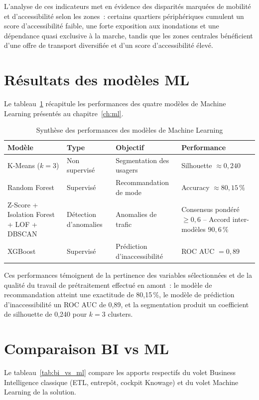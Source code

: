 L'analyse de ces indicateurs met en évidence des disparités marquées de mobilité et d'accessibilité selon les zones~: certains quartiers périphériques cumulent un score d'accessibilité faible, une forte exposition aux inondations et une dépendance quasi exclusive à la marche, tandis que les zones centrales bénéficient d'une offre de transport diversifiée et d'un score d'accessibilité élevé.

\section{Résultats des modèles ML}
Le tableau~\ref{tab:synth_ml} récapitule les performances des quatre modèles de Machine Learning présentés au chapitre~\ref{ch:ml}.

\begin{table}[H]
\centering
\caption{Synthèse des performances des modèles de Machine Learning}
\label{tab:synth_ml}
\begin{tabular}{p{3cm}p{2.8cm}p{4cm}p{3.2cm}}
\toprule
\textbf{Modèle} & \textbf{Type} & \textbf{Objectif} & \textbf{Performance} \\
\midrule
K-Means ($k=3$) & Non supervisé & Segmentation des usagers & Silhouette $\approx 0{,}240$ \\
Random Forest & Supervisé & Recommandation de mode & Accuracy $\approx 80{,}15\,\%$ \\
Z-Score + Isolation Forest + LOF + DBSCAN & Détection d'anomalies & Anomalies de trafic & Consensus pond\'er\'e $\geq 0{,}6$ -- Accord inter-mod\`eles $90{,}6\,\%$ \\
XGBoost & Supervisé & Prédiction d'inaccessibilité & ROC AUC $= 0{,}89$ \\
\bottomrule
\end{tabular}
\end{table}

Ces performances témoignent de la pertinence des variables sélectionnées et de la qualité du travail de prétraitement effectué en amont~: le modèle de recommandation atteint une exactitude de 80,15\,\%, le modèle de prédiction d'inaccessibilité un ROC AUC de 0,89, et la segmentation produit un coefficient de silhouette de 0,240 pour $k=3$ clusters.

\section{Comparaison BI vs ML}
Le tableau~\ref{tab:bi_vs_ml} compare les apports respectifs du volet Business Intelligence classique (ETL, entrepôt, cockpit Knowage) et du volet Machine Learning de la solution.

